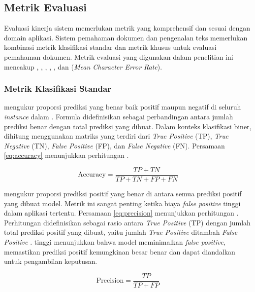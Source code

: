 \subsection{Metrik Evaluasi}
\label{subsec:metrik-evaluasi}

Evaluasi kinerja sistem \ml{} memerlukan metrik yang komprehensif dan sesuai dengan domain aplikasi. Sistem pemahaman dokumen dan pengenalan teks memerlukan kombinasi metrik klasifikasi standar dan metrik khusus untuk evaluasi pemahaman dokumen. Metrik evaluasi yang digunakan dalam penelitian ini mencakup \accuracy, \precision, \recall, \fscore, \coverage, dan \mcer{} (\emph{Mean Character Error Rate}).

\subsubsection{Metrik Klasifikasi Standar}

\accuracyfl{} mengukur proporsi prediksi yang benar baik positif maupun negatif di seluruh \emph{instance} dalam \dataset. Formula \accuracy{} didefinisikan sebagai perbandingan antara jumlah prediksi benar dengan total prediksi yang dibuat. Dalam konteks klasifikasi biner, \accuracy{} dihitung menggunakan matriks yang terdiri dari \emph{True Positive} (TP), \emph{True Negative} (TN), \emph{False Positive} (FP), dan \emph{False Negative} (FN). Persamaan \eqref{eq:accuracy} menunjukkan perhitungan \accuracy \parencite{jayaswal2020evalmetrics}. 

\begin{equation}
    \label{eq:accuracy}
\text{Accuracy} = \frac{TP + TN}{TP + TN + FP + FN}
\end{equation}

\precisionfl{} mengukur proporsi prediksi positif yang benar di antara semua prediksi positif yang dibuat model. Metrik ini sangat penting ketika biaya \emph{false positive} tinggi dalam aplikasi tertentu. Persamaan \eqref{eq:precision} menunjukkan perhitungan \precision. Perhitungan \precision{} didefinisikan sebagai rasio antara \emph{True Positive} (TP) dengan jumlah total prediksi positif yang dibuat, yaitu jumlah \emph{True Positive} ditambah \emph{False Positive} \parencite{jayaswal2020evalmetrics}. \precisionfl{} tinggi menunjukkan bahwa model meminimalkan \emph{false positive}, memastikan prediksi positif kemungkinan besar benar dan dapat diandalkan untuk pengambilan keputusan.

\begin{equation}
    \label{eq:precision}
\text{Precision} = \frac{TP}{TP + FP}
\end{equation}

